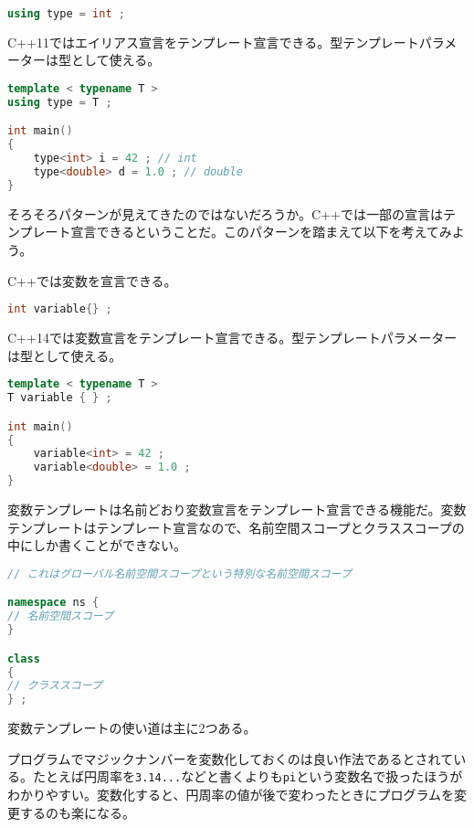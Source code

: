 \begin{lstlisting}[language=C++]
using type = int ;
\end{lstlisting}

C++11ではエイリアス宣言をテンプレート宣言できる。型テンプレートパラメーターは型として使える。

\begin{lstlisting}[language=C++]
template < typename T >
using type = T ;

int main()
{
    type<int> i = 42 ; // int
    type<double> d = 1.0 ; // double
}
\end{lstlisting}

そろそろパターンが見えてきたのではないだろうか。C++では一部の宣言はテンプレート宣言できるということだ。このパターンを踏まえて以下を考えてみよう。

C++では変数を宣言できる。

\begin{lstlisting}[language=C++]
int variable{} ;
\end{lstlisting}

C++14では変数宣言をテンプレート宣言できる。型テンプレートパラメーターは型として使える。

\begin{lstlisting}[language=C++]
template < typename T >
T variable { } ;

int main()
{
    variable<int> = 42 ;
    variable<double> = 1.0 ;
}
\end{lstlisting}

変数テンプレートは名前どおり変数宣言をテンプレート宣言できる機能だ。変数テンプレートはテンプレート宣言なので、名前空間スコープとクラススコープの中にしか書くことができない。

\begin{lstlisting}[language=C++]
// これはグローバル名前空間スコープという特別な名前空間スコープ

namespace ns {
// 名前空間スコープ
}

class
{
// クラススコープ
} ;
\end{lstlisting}

変数テンプレートの使い道は主に2つある。

%

プログラムでマジックナンバーを変数化しておくのは良い作法であるとされている。たとえば円周率を\lstinline!3.14...!などと書くよりも\lstinline!pi!という変数名で扱ったほうがわかりやすい。変数化すると、円周率の値が後で変わったときにプログラムを変更するのも楽になる。

